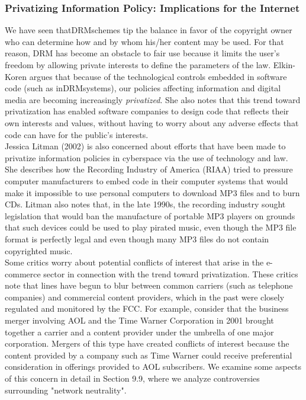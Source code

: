 \documentclass[12pt]{article}
\theoremstyle{definition}
\begin{document}
\subsubsection{Privatizing Information Policy: Implications for the Internet}
We have seen thatDRMschemes tip the balance in favor of the copyright owner who can
determine how and by whom his/her content may be used. For that reason, DRM has
become an obstacle to fair use because it limits the user’s freedom by allowing private
interests to define the parameters of the law. Elkin-Koren argues that because of the
technological controls embedded in software code (such as inDRMsystems), our policies
affecting information and digital media are becoming increasingly \textit{privatized}. She also
notes that this trend toward privatization has enabled software companies to design code
that reflects their own interests and values, without having to worry about any adverse
effects that code can have for the public’s interests.\\
Jessica Litman (2002) is also concerned about efforts that have been made to
privatize information policies in cyberspace via the use of technology and law. She
describes how the Recording Industry of America (RIAA) tried to pressure computer
manufacturers to embed code in their computer systems that would make it impossible to
use personal computers to download MP3 files and to burn CDs. Litman also notes that,
in the late 1990s, the recording industry sought legislation that would ban the manufacture
of portable MP3 players on grounds that such devices could be used to play pirated
music, even though the MP3 file format is perfectly legal and even though many MP3 files
do not contain copyrighted music.\\
Some critics worry about potential conflicts of interest that arise in the e-commerce
sector in connection with the trend toward privatization. These critics note that lines have
begun to blur between common carriers (such as telephone companies) and commercial
content providers, which in the past were closely regulated and monitored by the FCC.
For example, consider that the business merger involving AOL and the Time Warner
Corporation in 2001 brought together a carrier and a content provider under the
umbrella of one major corporation. Mergers of this type have created conflicts of interest
because the content provided by a company such as Time Warner could receive
preferential consideration in offerings provided to AOL subscribers. We examine
some aspects of this concern in detail in Section 9.9, where we analyze controversies
surrounding "network neutrality".
\end{document}
